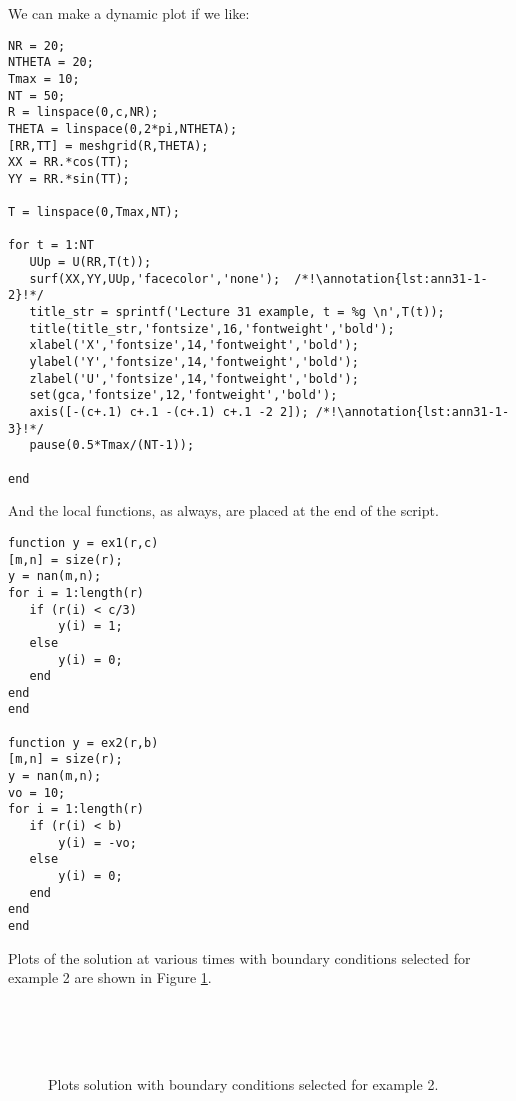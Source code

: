 \noindent We can make a dynamic plot if we like:
\begin{lstlisting}[name=lec31-ex1, style=myMatlab]
%% Plot the solution
NR = 20;
NTHETA = 20;
Tmax = 10;
NT = 50;
R = linspace(0,c,NR);
THETA = linspace(0,2*pi,NTHETA);
[RR,TT] = meshgrid(R,THETA);
XX = RR.*cos(TT);
YY = RR.*sin(TT);

T = linspace(0,Tmax,NT);

for t = 1:NT
   UUp = U(RR,T(t));
   surf(XX,YY,UUp,'facecolor','none');  /*!\annotation{lst:ann31-1-2}!*/
   title_str = sprintf('Lecture 31 example, t = %g \n',T(t));
   title(title_str,'fontsize',16,'fontweight','bold');
   xlabel('X','fontsize',14,'fontweight','bold');
   ylabel('Y','fontsize',14,'fontweight','bold');
   zlabel('U','fontsize',14,'fontweight','bold');
   set(gca,'fontsize',12,'fontweight','bold');
   axis([-(c+.1) c+.1 -(c+.1) c+.1 -2 2]); /*!\annotation{lst:ann31-1-3}!*/
   pause(0.5*Tmax/(NT-1));  
    
end
\end{lstlisting}

\vspace{0.25cm}

\noindent And the local functions, as always, are placed at the end of the script.

\begin{lstlisting}[name=lec31-ex1,style=myMatlab]
%% Local functions
function y = ex1(r,c)
[m,n] = size(r);
y = nan(m,n);
for i = 1:length(r)
   if (r(i) < c/3)
       y(i) = 1;
   else
       y(i) = 0;
   end    
end
end

function y = ex2(r,b)
[m,n] = size(r);
y = nan(m,n);
vo = 10;
for i = 1:length(r)
   if (r(i) < b)
       y(i) = -vo;
   else
       y(i) = 0;
   end    
end
end
\end{lstlisting}
Plots of the solution at various times with boundary conditions selected for example 2 are shown in Figure \ref{fig:lec31-ex1-plots}.
\begin{figure}[h!]
 \\
 \\
 \\
\label{fig:lec31-ex1-plots}
\caption{Plots solution with boundary conditions selected for example 2.}
\end{figure}

